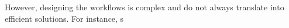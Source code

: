 However, designing the workflows is complex and do not always translate into efficient solutions. For instance, s